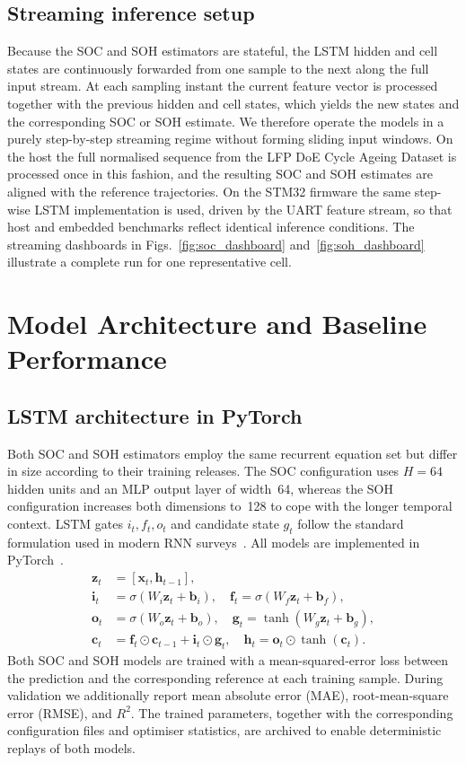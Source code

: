 \documentclass[review]{elsarticle}
\begin{document}
\subsection{Streaming inference setup}
Because the SOC and SOH estimators are stateful, the LSTM hidden and cell states are continuously forwarded from one sample to the next along the full input stream. At each sampling instant the current feature vector is processed together with the previous hidden and cell states, which yields the new states and the corresponding SOC or SOH estimate. We therefore operate the models in a purely step-by-step streaming regime without forming sliding input windows. On the host the full normalised sequence from the LFP DoE Cycle Ageing Dataset is processed once in this fashion, and the resulting SOC and SOH estimates are aligned with the reference trajectories. On the STM32 firmware the same step-wise LSTM implementation is used, driven by the UART feature stream, so that host and embedded benchmarks reflect identical inference conditions. The streaming dashboards in Figs.~\ref{fig:soc_dashboard} and~\ref{fig:soh_dashboard} illustrate a complete run for one representative cell.
\section{Model Architecture and Baseline Performance}
\subsection{LSTM architecture in PyTorch}
Both SOC and SOH estimators employ the same recurrent equation set but differ in size according to their training releases. The SOC configuration uses $H=64$ hidden units and an MLP output layer of width~64, whereas the SOH configuration increases both dimensions to~128 to cope with the longer temporal context. LSTM gates $i_t,f_t,o_t$ and candidate state $g_t$ follow the standard formulation used in modern RNN surveys~\cite{liptonCriticalReviewRecurrent2015}. All models are implemented in PyTorch~\cite{paszkePyTorchImperativeStyle2019}.
\begin{align}
    \mathbf{z}_t &= [\mathbf{x}_t,\mathbf{h}_{t-1}],\\
    \mathbf{i}_t &= \sigma(W_i \mathbf{z}_t + \mathbf{b}_i), \quad
    \mathbf{f}_t = \sigma(W_f \mathbf{z}_t + \mathbf{b}_f), \nonumber\\
    \mathbf{o}_t &= \sigma(W_o \mathbf{z}_t + \mathbf{b}_o), \quad
    \mathbf{g}_t = \tanh(W_g \mathbf{z}_t + \mathbf{b}_g), \nonumber\\
    \mathbf{c}_t &= \mathbf{f}_t \odot \mathbf{c}_{t-1} + \mathbf{i}_t \odot \mathbf{g}_t,\quad
    \mathbf{h}_t = \mathbf{o}_t \odot \tanh(\mathbf{c}_t). \nonumber
\end{align}
Both SOC and SOH models are trained with a mean-squared-error loss between the prediction and the corresponding reference at each training sample. During validation we additionally report mean absolute error (MAE), root-mean-square error (RMSE), and $R^2$. The trained parameters, together with the corresponding configuration files and optimiser statistics, are archived to enable deterministic replays of both models.
\end{document}
